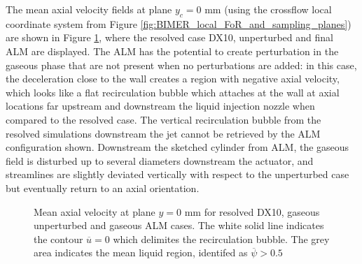 The mean axial velocity fields at plane $y_c = 0$ mm (using the crossflow local coordinate system from Figure \ref{fig:BIMER_local_FoR_and_sampling_planes}) are shown in Figure \ref{fig:BIMER_LGS_turbulent_structures_plane_y0}, where the resolved case DX10, unperturbed and final ALM are displayed. The ALM has the potential to create perturbation in the gaseous phase that are not present when no perturbations are added: in this case, the deceleration close to the wall creates a region with negative axial velocity, which looks like a flat recirculation bubble which attaches at the wall at axial locations far upstream and downstream the liquid injection nozzle when compared to the resolved case. The vertical recirculation bubble from the resolved simulations downstream the jet cannot be retrieved by the ALM configuration shown. Downstream the sketched cylinder from ALM, the gaseous field is disturbed up to several diameters downstream the actuator, and streamlines are slightly deviated vertically with respect to the unperturbed case but eventually return to an axial orientation.



\begin{figure}[ht]
\centering
\caption[Mean axial velocity at plane $y = 0$ mm]{Mean axial velocity at plane $y = 0$ mm for resolved DX10, gaseous unperturbed and gaseous ALM cases. The white solid line indicates the contour $\overline{u} = 0$ which delimites the recirculation bubble. The grey area indicates the mean liquid region, identifed as $\overline{\psi} > 0.5$}
\label{fig:BIMER_LGS_turbulent_structures_plane_y0}
\end{figure}

